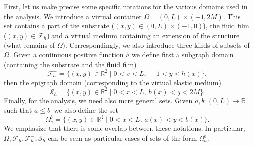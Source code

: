 \documentclass[10pt]{amsart}
\let\mathcal\mathscr
\theoremstyle{remark}
\theoremstyle{definition}
\newcommand{\Real}{\mathbb{R}}
\let\CM\Omega
\begin{document}
First, let us make precise some specific notations for the various domains used in the analysis. We introduce a virtual container $\Omega = (0,L) \times (-1,2M)$. This set contains a part of the substrate ($(x,y) \in (0,L) \times (-1,0)$), the fluid film
($(x,y) \in \mathcal F_h$) and a virtual medium containing an extension of the structure (what remains of $\Omega$).
Correspondingly, we also introduce three kinds of subsets of $\Omega$. Given a continuous positive function $h$ we define first a subgraph domain (containing the substrate and the fluid film)
\[\mathcal{F}^-_{h}=\{(x,y)\in\Real^{2}\mid 0<x<L,\,-1<y<h(x)\},\]
then the epigraph domain (corresponding to the virtual elastic medium)
\[\mathcal{S}_{h}=\{(x,y)\in\Real^{2}\mid 0<x<L,\,h(x)<y<2M\}.\]
Finally, for the analysis, we need also more general sets. Given $a,b:(0,L)\to \Real$ such that $a \leq b$,
we also define the set
\[\Omega_{a}^{b}=\{(x,y)\in\Real^{2}\mid 0<x<L,\,a(x)<y<b(x)\}.\]
We emphasize that there is some overlap between these notations.
In particular, $\CM, \mathcal{F}_{h}, \mathcal{F}^-_{h}, \mathcal{S}_{h}$ can be seen as particular cases of sets of the form $\Omega_{a}^{b}$.
\end{document}
